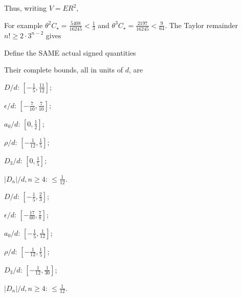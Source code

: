 Thus, writing \(V=ER^2\),


For example \(\theta^2 C_\star=\frac{5408}{16245}<\frac{1}{3}\) and \(\theta^3 C_\star=\frac{2197}{16245}<\frac{9}{64}\). The Taylor remainder \(n!\ge 2\cdot 3^{n-2}\) gives


Define the SAME actual signed quantities


Their complete bounds, all in units of \(d\), are

\begin{description}[style=nextline,leftmargin=1.6em,before=\raggedright]
\item[{2}] \(D/d\): \([-\frac{1}{5},\allowbreak \allowbreak \frac{11}{12}]\);\par\noindent \(\epsilon/d\): \([-\frac{7}{10},\allowbreak \allowbreak \frac{7}{10}]\);\par\noindent \(a_0/d\): \([0,\allowbreak \allowbreak \frac{1}{2}]\);\par\noindent \(\rho/d\): \([-\frac{1}{12},\allowbreak \allowbreak \frac{1}{5}]\);\par\noindent \(D_3/d\): \([0,\allowbreak \allowbreak \frac{1}{5}]\);\par\noindent \(\lvert D_n\rvert /d,\allowbreak \allowbreak  n\ge 4\): \(\le \frac{1}{12}\).
\item[{3}] \(D/d\): \([-\frac{1}{5},\allowbreak \allowbreak \frac{2}{3}]\);\par\noindent \(\epsilon/d\): \([-\frac{17}{60},\allowbreak \allowbreak \frac{7}{8}]\);\par\noindent \(a_0/d\): \([-\frac{1}{5},\allowbreak \allowbreak \frac{1}{12}]\);\par\noindent \(\rho/d\): \([-\frac{1}{12},\allowbreak \allowbreak \frac{1}{5}]\);\par\noindent \(D_3/d\): \([-\frac{1}{12},\allowbreak \allowbreak \frac{1}{30}]\);\par\noindent \(\lvert D_n\rvert /d,\allowbreak \allowbreak  n\ge 4\): \(\le \frac{1}{12}\).
\end{description}

